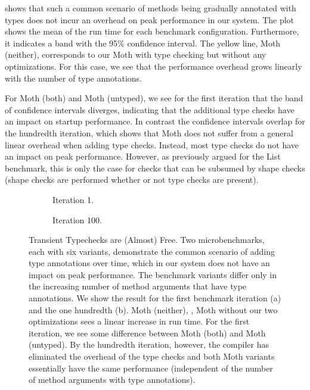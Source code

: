  shows that such a common scenario of methods being
gradually annotated with types
does not incur an overhead on peak performance in our system.
The plot shows the mean of the run time for each benchmark configuration.
Furthermore, it indicates a band with the 95\% confidence interval.
The yellow line, Moth (neither), corresponds to our Moth with type checking
but without any optimizations.
For this case, we see that the performance overhead grows
linearly with the number of type annotations.

For Moth (both) and Moth (untyped), we see for the first iteration that
the band of confidence intervals diverges, indicating that the additional type
checks have an impact on startup performance.
In contrast the confidence intervals overlap for the hundredth iteration,
which shows that Moth does not suffer from
a general linear overhead when adding type checks.
Instead, most type checks do not have an impact on peak performance.
However, as previously argued for the List benchmark,
this is only the case for checks that can be subsumed by shape checks
(shape checks are performed whether or not type checks are present).

\begin{figure}
  \begin{subfigure}[t]{0.5\textwidth}
    \centering
    \TypeCostFirstIt{}
    \caption{Iteration 1.}
  \end{subfigure}\hfill
  \begin{subfigure}[t]{0.5\textwidth}
    \centering
    \TypeCostLastIt{}
    \caption{Iteration 100.}
  \end{subfigure}

  \caption{Transient Typechecks are (Almost) Free.
    Two microbenchmarks, each with six variants, demonstrate the common scenario
    of adding type annotations over time, which in our system does not have an impact on peak performance.
    The benchmark variants differ only in the increasing number
    of method arguments that have type annotations.
    We show the result for the first benchmark iteration (a) and the
    one hundredth (b).
    Moth (neither), \ie, Moth without our two optimizations sees a linear increase in run time.
    For the first iteration, we see some difference between Moth (both) and Moth (untyped).
    By the hundredth iteration, however, the compiler has eliminated
    the overhead of the type checks
    and both Moth variants essentially have the same performance
    (independent of the number of method arguments with type annotations).}
	\label{fig:type-cost-micro}
\end{figure}

